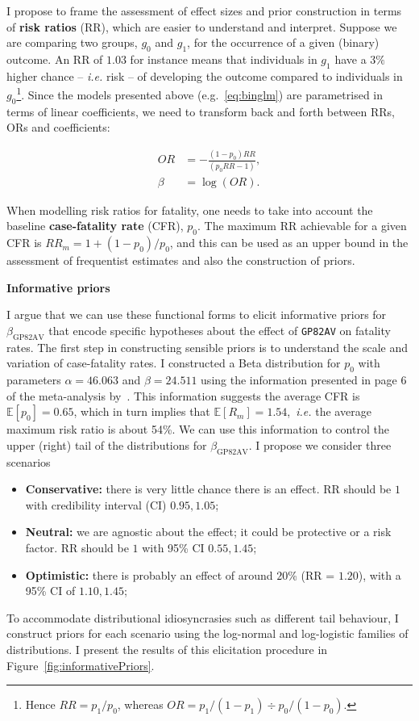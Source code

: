 I propose to frame the assessment of effect sizes and prior construction in terms of \textbf{risk ratios} (RR), which are easier to understand and interpret.
Suppose we are comparing two groups, $g_0$ and $g_1$, for the occurrence of a given (binary) outcome.
An RR  of $1.03$ for instance means that individuals in $g_1$ have a $3\%$ higher chance -- \textit{i.e.} risk --  of developing the outcome compared to individuals in $g_0$\footnote{Hence $RR = p_1/p_0$, whereas $OR = p_1/(1-p_1) \div p_0/(1-p_0)$.}.
Since the models presented above (e.g.~\ref{eq:binglm}) are parametrised in terms of linear coefficients, we need to transform back and forth between RRs, ORs and coefficients:

\begin{align}
\label{eq:ORRRa}
 OR &= -\frac{(1-p_0)RR}{(p_0 RR -1)}, \\
 \label{eq:ORRRb}
 \beta &= \log(OR).
\end{align}

When modelling risk ratios for fatality, one needs to take into account the baseline \textbf{case-fatality rate} (CFR), $p_0$.
The maximum RR achievable for a given CFR is $RR_m = 1 + (1-p_0)/p_0$, and this can be used as an upper bound in the assessment of frequentist estimates and also the construction of priors.

\textbf{Informative priors}

I argue that we can use these functional forms to elicit informative priors for $\beta_{\text{GP82AV}}$ that encode specific hypotheses about the effect of \verb|GP82AV| on fatality rates.
The first step in constructing sensible priors is to understand the scale and variation of case-fatality rates.
I constructed a Beta distribution for $p_0$  with parameters $\alpha = 46.063$ and $\beta = 24.511$ using the information presented in page 6 of the meta-analysis by~\cite{Nyakarahuka2016}.
This information suggests the average CFR is $\mathbb{E}[p_0]= 0.65$, which in turn implies that $\mathbb{E}[R_m] = 1.54$,~\textit{i.e.} the average maximum risk ratio is about 54\%.
We can use this information to control the upper (right) tail of the distributions for $\beta_{\text{GP82AV}}$.
I propose we consider three scenarios
\begin{itemize}
 \item \textbf{Conservative:} there is very little chance there is an effect.
 RR should be $1$ with credibility interval (CI) $0.95, 1.05$;
 \item \textbf{Neutral:} we are agnostic about the effect; it could be protective or a risk factor.
 RR should be $1$ with 95\% CI $0.55, 1.45$;
 \item \textbf{Optimistic:} there is probably an effect of around $20$\% (RR = $1.20$), with a 95\% CI of $1.10, 1.45$;
\end{itemize}
To accommodate distributional idiosyncrasies such as different tail behaviour, I construct priors for each scenario using the log-normal and log-logistic families of distributions.
I present the results of this elicitation procedure in Figure~\ref{fig:informativePriors}.

